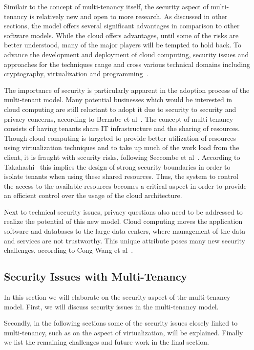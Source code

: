 Similair to the concept of multi-tenancy itself, the security aspect of multi-tenancy is relatively new and open to more research. 
As discussed in other sections, the model offers several significant advantages in comparison to other software models. 
While the cloud offers advantages, until some of the risks are better understood, many of the major players will be tempted to hold back. 
To advance the development and deployment of cloud computing, security issues and approaches for the techniques range and cross various technical domains including cryptography, virtualization and programming~\cite{Takahashi2012Security}. 

The importance of security is particularly apparent in the adoption process of the multi-tenant model. 
Many potential businesses which would be interested in cloud computing are still reluctant to adopt it due to security to security and privacy concerns, according to Bernabe et al~\cite{Bernabe2012Auth}. 
The concept of multi-tenancy consists of having tenants share IT infrastructure and the sharing of resources. 
Though cloud computing is targeted to provide better utilization of resources using virtualization techniques and to take up much of the work load from the client, it is fraught with security risks, following Seccombe et al~\cite{Seccombe2009Security}. 
According to Takahashi~\cite{Takahashi2012Security} this implies the design of strong security boundaries in order to isolate tenants when using these shared resources. 
Thus, the system to control the access to the available resources becomes a critical aspect in order to provide an efficient control over the usage of the cloud architecture.

Next to technical security issues, privacy questions also need to be addressed to realize the potential of this new model. 
Cloud computing moves the application software and databases to the large data centers, where management of the data and services are not trustworthy. 
This unique attribute poses many new security challenges, according to Cong Wang et al~\cite{Wang2009Security}. 

\subsection{Security Issues with Multi-Tenancy}
In this section we will elaborate on the security aspect of the multi-tenancy model. 
First, we will discuss security issues in the multi-tenancy model.

Secondly, in the following sections some of the security issues closely linked to multi-tenancy, such as on the aspect of virtualization, will be explained. 
Finally we list the remaining challenges and future work in the final section.

